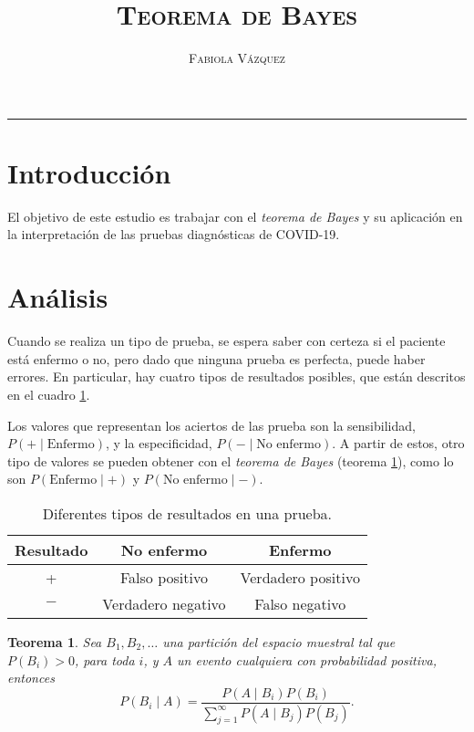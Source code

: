 \documentclass[12pt,letterpaper]{article}
\title{\textsc{Teorema de Bayes}}
\author{\textsc{Fabiola Vázquez}}
\newtheorem{theorem}{Teorema}
\begin{document}
\maketitle

\hrule
\section{Introducción}
El objetivo de este estudio es trabajar con el \textit{teorema de Bayes} y su aplicación en la interpretación de las pruebas diagnósticas de COVID-19. 

\section{Análisis}
Cuando se realiza un tipo de prueba, se espera saber con certeza si el paciente está enfermo o no, pero dado que ninguna prueba es perfecta, puede haber errores. En particular, hay cuatro tipos de resultados posibles, que están descritos en el cuadro \ref{resultados}. 

Los valores que representan los aciertos de las prueba son la sensibilidad, $P(+\mid \text{Enfermo})$, y la especificidad, $P(-\mid \text{No enfermo}).$ A partir de estos, otro tipo de valores se pueden obtener con el \textit{teorema de Bayes} (teorema \ref{thm}), como lo son $P(\text{Enfermo} \mid +)$ y $P(\text{No enfermo} \mid -)$.
\begin{table}
\centering
\caption{Diferentes tipos de resultados en una prueba.}
\begin{tabular}{|c|c|c|}
\hline 
Resultado & No enfermo & Enfermo \\ 
\hline 
+ & Falso positivo &  Verdadero positivo \\ 
\hline 
$-$ &  Verdadero negativo & Falso negativo  \\ 
\hline 
\end{tabular} 
\label{resultados}
\end{table}

\begin{theorem} \label{thm}
Sea $B_1, B_2, \ldots$ una partición del espacio muestral tal que $P(B_i)>0$, para toda $i$, y $A$ un evento cualquiera con probabilidad positiva, entonces 
\begin{equation} 
P(B_i \mid A) = \frac{P(A \mid B_i ) P(B_i)}{\sum^\infty_{j=1} P(A \mid B_j) P(B_j)}.
\end{equation}
\end{theorem}
\end{document}

